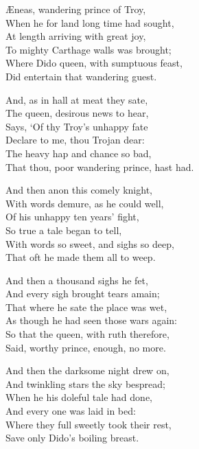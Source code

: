 \settowidth{\versewidth}{That thou, poor wandering prince, hast had.}
\begin{dcverse}\begin{patverse}
Æneas, wandering prince of Troy,\\
When he for land long time had sought,\\
At length arriving with great joy,\\
To mighty Carthage walls was brought;\\
Where Dido queen, with sumptuous feast,\\
Did entertain that wandering guest.
\end{patverse}

\begin{patverse}
And, as in hall at meat they sate,\\
The queen, desirous news to hear,\\
Says, ‘Of thy Troy’s unhappy fate\\
Declare to me, thou Trojan dear:\\
The heavy hap and chance so bad,\\
That thou, poor wandering prince, hast had.
\end{patverse}

\begin{patverse}
And then anon this comely knight,\\
With words demure, as he could well,\\
Of his unhappy ten years’ fight,\\
So true a tale began to tell,\\
With words so sweet, and sighs so deep,\\
That oft he made them all to weep.
\end{patverse}

\begin{patverse}
And then a thousand sighs he fet,\\
And every sigh brought tears amain;\\
That where he sate the place was wet,\\
As though he had seen those wars again:\\
So that the queen, with ruth therefore,\\
Said, worthy prince, enough, no more.
\end{patverse}

\begin{patverse}
And then the darksome night drew on,\\
And twinkling stars the sky bespread;\\
When he his doleful tale had done,\\
And every one was laid in bed:\\
Where they full sweetly took their rest,\\
Save only Dido’s boiling breast.
\end{patverse}


\end{dcverse}
